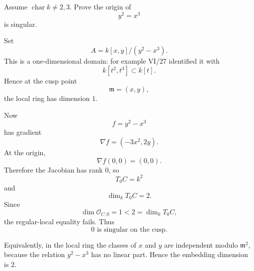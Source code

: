 \begin{problem}\label{prob:vi32-07}
Assume \(\operatorname{char}k\ne2,3\). Prove the origin of
\[
y^2=x^3
\]
is singular.

\end{problem}

\ifdefined\FullProblemDossiers
\begin{solution}
Set
\[
A=k[x,y]/(y^2-x^3).
\]
This is a one-dimensional domain: for example VI/27 identified it with
\[
k[t^2,t^3]\subset k[t].
\]
Hence at the cusp point
\[
\mathfrak m=(x,y),
\]
the local ring has dimension \(1\).

Now
\[
f=y^2-x^3
\]
has gradient
\[
\nabla f=(-3x^2,2y).
\]
At the origin,
\[
\nabla f(0,0)=(0,0).
\]
Therefore the Jacobian has rank \(0\), so
\[
T_0C=k^2
\]
and
\[
\dim_kT_0C=2.
\]
Since
\[
\dim\mathcal O_{C,0}=1<2=\dim_kT_0C,
\]
the regular-local equality fails. Thus
\[
\boxed{0\text{ is singular on the cusp}.}
\]

Equivalently, in the local ring the classes of \(x\) and \(y\) are independent modulo \(\mathfrak m^2\), because
the relation \(y^2-x^3\) has no linear part. Hence the embedding dimension is \(2\).
\end{solution}
\fi
